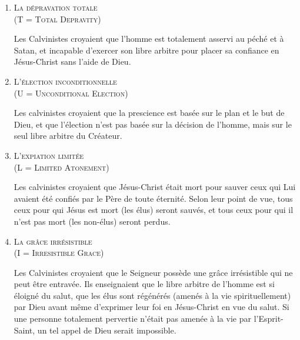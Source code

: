 \begin{enumerate}

  \item  \textsc{La dépravation totale\\\nobreak (\og T \fg{} = Total Depravity)}

\nobreak
Les Calvinistes croyaient que l'hom\-me est totalement 
 asservi au péché  et à Satan,
 et incapable d'exercer son libre arbitre 
 pour placer sa confiance en Jésus-Christ sans l'aide de Dieu.

  \item  \textsc{L'élection inconditionnelle\\\nobreak (\og U \fg{} = Unconditional Election)}

\nobreak
Les calvinistes croyaient que la prescience 
 est basée sur le plan et le but de Dieu, et que l'élection
 n'est pas basée sur la décision de l'homme, mais sur le seul \og libre arbitre \fg{}
 du Créateur.

\pocketpagebreak
  \item  \textsc{L'expiation limitée\\\nobreak (\og L \fg{} = Limited Atonement)}

\nobreak
Les calvinistes croyaient que Jésus-Christ était mort pour sauver
 ceux qui Lui avaient été confiés par le Père de toute éternité.
 Selon leur point de vue, tous ceux pour qui Jésus est mort (les élus) seront sauvés,
 et tous ceux pour qui il n'est pas mort (les non-élus) seront perdus.

  \item  \textsc{La grâce irrésistible\\\nobreak (\og I \fg{} = Irresistible Grace)}

\nobreak
\begin{specialpar}{}
Les Calvinistes croyaient que le Seigneur possède une grâce irrésistible
 qui ne peut être entravée. Ils enseignaient que le libre arbitre de l'hom\-me
 est si éloigné du salut, que les élus sont régénérés (amenés à la vie spirituellement)
 par Dieu avant \pocketlinebreak
 même d'exprimer leur foi en Jésus-Christ en vue du salut.
 Si une per\-son\-ne totalement pervertie n'était pas amenée à la vie par l'Esprit-Saint,
 un tel appel de Dieu serait impossible.
\end{specialpar}


\end{enumerate}
